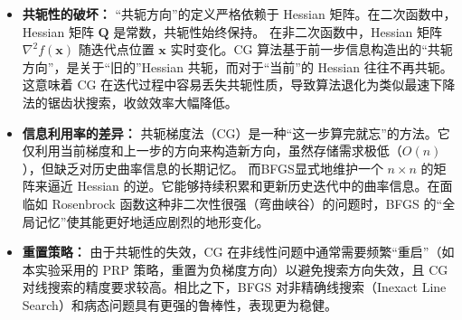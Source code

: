 \documentclass[a4paper,12pt]{article}
\begin{document}
\begin{itemize}
    \item \textbf{共轭性的破坏：} 
    “共轭方向”的定义严格依赖于 Hessian 矩阵。在二次函数中，Hessian 矩阵 $\bm{Q}$ 是常数，共轭性始终保持。
    在非二次函数中，Hessian 矩阵 $\nabla^2 f(\bm{x})$ 随迭代点位置 $\bm{x}$ 实时变化。CG 算法基于前一步信息构造出的“共轭方向”，是关于“旧的”Hessian 共轭，而对于“当前”的 Hessian 往往不再共轭。
    这意味着 CG 在迭代过程中容易丢失共轭性质，导致算法退化为类似最速下降法的锯齿状搜索，收敛效率大幅降低。
    \item \textbf{信息利用率的差异：}
    共轭梯度法（CG）是一种“这一步算完就忘”的方法。它仅利用当前梯度和上一步的方向来构造新方向，虽然存储需求极低（$O(n)$），但缺乏对历史曲率信息的长期记忆。
    而BFGS显式地维护一个 $n \times n$ 的矩阵来逼近 Hessian 的逆。它能够持续积累和更新历史迭代中的曲率信息。在面临如 Rosenbrock 函数这种非二次性很强（弯曲峡谷）的问题时，BFGS 的“全局记忆”使其能更好地适应剧烈的地形变化。
    \item \textbf{重置策略：}
    由于共轭性的失效，CG 在非线性问题中通常需要频繁“重启”（如本实验采用的 PRP 策略，重置为负梯度方向）以避免搜索方向失效，且 CG 对线搜索的精度要求较高。相比之下，BFGS 对非精确线搜索（Inexact Line Search）和病态问题具有更强的鲁棒性，表现更为稳健。
\end{itemize}
\end{document}
